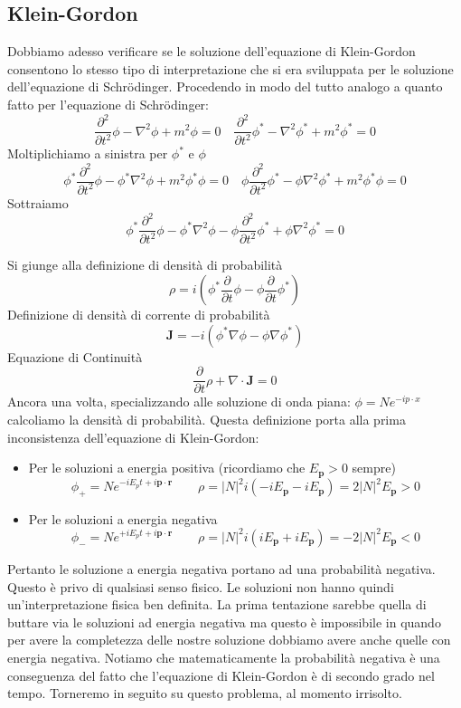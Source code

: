 \subsection{Klein-Gordon}
Dobbiamo adesso verificare se le soluzione dell'equazione di Klein-Gordon consentono lo stesso tipo di interpretazione che si era sviluppata per le soluzione dell'equazione di Schr\"odinger. Procedendo in modo del tutto analogo a quanto fatto per l'equazione di Schr\"odinger:
$$
\frac{\partial^2}{\partial t^2} \phi-\nabla^2 \phi+m^2 \phi=0 \quad \frac{\partial^2}{\partial t^2} \phi^*-\nabla^2 \phi^*+m^2 \phi^*=0
$$
Moltiplichiamo a sinistra per $\phi^*$ e $\phi$
$$
\phi^* \frac{\partial^2}{\partial t^2} \phi-\phi^* \nabla^2 \phi+m^2 \phi^* \phi=0 \quad \phi \frac{\partial^2}{\partial t^2} \phi^*-\phi \nabla^2 \phi^*+m^2 \phi^* \phi=0
$$
Sottraiamo
$$
\phi^* \frac{\partial^2}{\partial t^2} \phi-\phi^* \nabla^2 \phi-\phi \frac{\partial^2}{\partial t^2} \phi^*+\phi \nabla^2 \phi^*=0
$$

Si giunge alla definizione di densità di probabilità
$$
\rho=i\left(\phi^* \frac{\partial}{\partial t} \phi-\phi \frac{\partial}{\partial t} \phi^*\right)
$$
Definizione di densità di corrente di probabilità
$$
\mathbf{J}=-i\left(\phi^*\nabla\phi-\phi\nabla\phi^*\right)
$$
Equazione di Continuità
$$
\frac{\partial}{\partial t} \rho+\nabla \cdot \mathbf{J}=0
$$
Ancora una volta, specializzando alle soluzione di onda piana: $\phi=Ne^{-ip\cdot x}$ calcoliamo la densità di probabilità. Questa definizione porta alla prima inconsistenza dell'equazione di Klein-Gordon:
\begin{itemize}
    \item Per le soluzioni a energia positiva (ricordiamo che $E_\mathbf{p}>0$ sempre) $$ \phi_+ = Ne^{-iE_p t + i\mathbf{p} \cdot \mathbf{r}} \qquad \rho=|N|^2i(-iE_\mathbf{p}-iE_\mathbf{p})=2|N|^2E_\mathbf{p}>0$$
    \item Per le soluzioni a energia negativa
    $$ \phi_- = Ne^{+iE_p t + i\mathbf{p} \cdot \mathbf{r}} \qquad \rho=|N|^2i(iE_\mathbf{p}+iE_\mathbf{p})=-2|N|^2E_\mathbf{p}<0$$
\end{itemize}
Pertanto le soluzione a energia negativa portano ad una probabilità negativa. Questo è privo di qualsiasi senso fisico. Le soluzioni non hanno quindi un'interpretazione fisica ben definita. La prima tentazione sarebbe quella di buttare via le soluzioni ad energia negativa ma questo è impossibile in quando per avere la completezza delle nostre soluzione dobbiamo avere anche quelle con energia negativa. Notiamo che matematicamente la probabilità negativa è una conseguenza del fatto che l'equazione di Klein-Gordon è di secondo grado nel tempo. Torneremo in seguito su questo problema, al momento irrisolto. 

